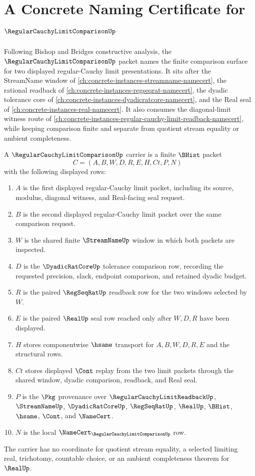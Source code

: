 \chapter{A Concrete Naming Certificate for $\RegularCauchyLimitComparisonUp$}
\label{ch:concrete-instances-regular-cauchy-limit-comparison-namecert}

Following Bishop and Bridges constructive analysis, the $\RegularCauchyLimitComparisonUp$ packet names the finite comparison surface for two displayed regular-Cauchy limit presentations. It sits after the StreamName window of \autoref{ch:concrete-instances-streamname-namecert}, the rational readback of \autoref{ch:concrete-instances-regseqrat-namecert}, the dyadic tolerance core of \autoref{ch:concrete-instances-dyadicratcore-namecert}, and the Real seal of \autoref{ch:concrete-instances-real-namecert}. It also consumes the diagonal-limit witness route of \autoref{ch:concrete-instances-regular-cauchy-limit-readback-namecert}, while keeping comparison finite and separate from quotient stream equality or ambient completeness.

\begin{definition}
\label{def:regular-cauchy-limit-comparison-carrier}
A $\RegularCauchyLimitComparisonUp$ carrier is a finite $\BHist$ packet
$$
C=(A,B,W,D,R,E,H,Ct,P,N)
$$
with the following displayed rows:
\begin{enumerate}
\item $A$ is the first displayed regular-Cauchy limit packet, including its source, modulus, diagonal witness, and Real-facing seal request.
\item $B$ is the second displayed regular-Cauchy limit packet over the same comparison request.
\item $W$ is the shared finite $\StreamNameUp$ window in which both packets are inspected.
\item $D$ is the $\DyadicRatCoreUp$ tolerance comparison row, recording the requested precision, slack, endpoint comparison, and retained dyadic budget.
\item $R$ is the paired $\RegSeqRatUp$ readback row for the two windows selected by $W$.
\item $E$ is the paired $\RealUp$ seal row reached only after $W,D,R$ have been displayed.
\item $H$ stores componentwise $\hsame$ transport for $A,B,W,D,R,E$ and the structural rows.
\item $Ct$ stores displayed $\Cont$ replay from the two limit packets through the shared window, dyadic comparison, readback, and Real seal.
\item $P$ is the $\Pkg$ provenance over $\RegularCauchyLimitReadbackUp$, $\StreamNameUp$, $\DyadicRatCoreUp$, $\RegSeqRatUp$, $\RealUp$, $\BHist$, $\hsame$, $\Cont$, and $\NameCert$.
\item $N$ is the local $\NameCert_{\RegularCauchyLimitComparisonUp}$ row.
\end{enumerate}
The carrier has no coordinate for quotient stream equality, a selected limiting real, trichotomy, countable choice, or an ambient completeness theorem for $\RealUp$.
\end{definition}

